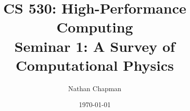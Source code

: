 \documentclass{report}
\title{CS 530: High-Performance Computing \\ Seminar 1: A Survey of Computational Physics}
\author{Nathan Chapman}
\affil{Department of Computer Science, Central Washington University}
\date{\today}
\begin{document}
\maketitle

\tableofcontents
\pagebreak








\end{document}
